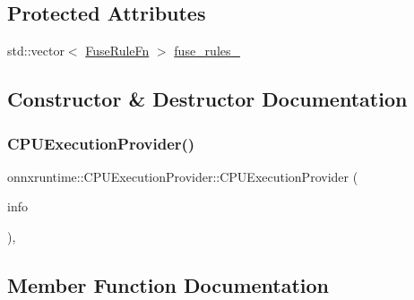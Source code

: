 \subsection*{Protected Attributes}
\begin{DoxyCompactItemize}
\item 
std\+::vector$<$ \mbox{\hyperlink{namespaceonnxruntime_a916d9c71f5b38a56c21340f816954b88}{Fuse\+Rule\+Fn}} $>$ \mbox{\hyperlink{classonnxruntime_1_1CPUExecutionProvider_a193342bb5a357f5dc4191c671042aaeb}{fuse\+\_\+rules\+\_\+}}
\end{DoxyCompactItemize}


\subsection{Constructor \& Destructor Documentation}
\mbox{\label{classonnxruntime_1_1CPUExecutionProvider_a5f91ac5db5c44ab00e6685995bec416e}} 
\subsubsection{\texorpdfstring{C\+P\+U\+Execution\+Provider()}{CPUExecutionProvider()}}
{\footnotesize\ttfamily onnxruntime\+::\+C\+P\+U\+Execution\+Provider\+::\+C\+P\+U\+Execution\+Provider (\begin{DoxyParamCaption}\item[{const \mbox{\hyperlink{structonnxruntime_1_1CPUExecutionProviderInfo}{C\+P\+U\+Execution\+Provider\+Info}} \&}]{info }\end{DoxyParamCaption})\hspace{0.3cm}{\ttfamily [inline]}, {\ttfamily [explicit]}}



\subsection{Member Function Documentation}
\mbox{\label{classonnxruntime_1_1CPUExecutionProvider_a6fc53592b62c7774860e59102df871f3}} 
